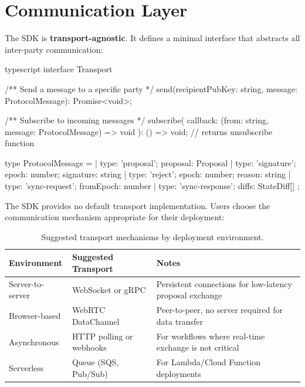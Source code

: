 \documentclass[11pt,a4paper]{article}
\begin{document}
\section{Communication Layer}

The SDK is \textbf{transport-agnostic}. It defines a minimal interface that
abstracts all inter-party communication:

\begin{codebox}{typescript}
interface Transport {
  /** Send a message to a specific party */
  send(recipientPubKey: string, message: ProtocolMessage): Promise<void>;

  /** Subscribe to incoming messages */
  subscribe(
    callback: (from: string, message: ProtocolMessage) => void
  ): () => void;  // returns unsubscribe function
}

type ProtocolMessage =
  | { type: 'proposal'; proposal: Proposal }
  | { type: 'signature'; epoch: number; signature: string }
  | { type: 'reject'; epoch: number; reason: string }
  | { type: 'sync-request'; fromEpoch: number }
  | { type: 'sync-response'; diffs: StateDiff[] };
\end{codebox}

\noindent The SDK provides no default transport implementation. Users choose
the communication mechanism appropriate for their deployment:

\begin{table}[H]
\centering
\begin{tabular}{llp{6cm}}
\toprule
\textbf{Environment} & \textbf{Suggested Transport} & \textbf{Notes} \\
\midrule
Server-to-server & WebSocket or gRPC & Persistent connections for low-latency
  proposal exchange \\
Browser-based & WebRTC DataChannel & Peer-to-peer, no server required for
  data transfer \\
Asynchronous & HTTP polling or webhooks & For workflows where real-time
  exchange is not critical \\
Serverless & Queue (SQS, Pub/Sub) & For Lambda/Cloud Function deployments \\
\bottomrule
\end{tabular}
\caption{Suggested transport mechanisms by deployment environment.}
\label{tab:transport}
\end{table}
\end{document}

